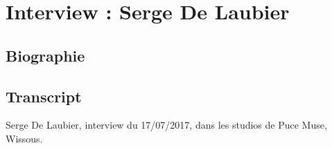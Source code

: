 \chapter{Interview : Serge De Laubier}
\label{appendix:delaubier}

\section*{Biographie}


\section*{Transcript}
Serge De Laubier, interview du 17/07/2017, dans les studios de Puce Muse, Wissous.

